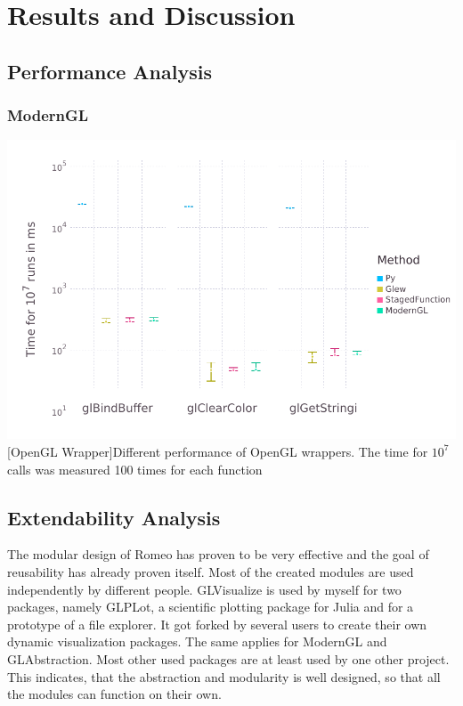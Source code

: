 \section{Results and Discussion}

\subsection{Performance Analysis}
\subsubsection{ModernGL}
\vspace{1em}
\begin{minipage}{\linewidth}
    \centering
    \includegraphics[width=0.7\linewidth]{graphics/glbench.pdf}
    [OpenGL Wrapper]{Different performance of OpenGL wrappers. The time for $10^7$ calls was measured 100 times for each function}
    \label{fig:openglwrapper}
\end{minipage}

\subsection{Extendability Analysis}

The modular design of Romeo has proven to be very effective and the goal of reusability has already proven itself.
Most of the created modules are used independently by different people.
GLVisualize is used by myself for two packages, namely GLPLot, a scientific plotting package for Julia and for a prototype of a file explorer. 
It got forked by several users to create their own dynamic visualization packages.
The same applies for ModernGL and GLAbstraction. Most other used packages are at least used by one other project.
This indicates, that the abstraction and modularity is well designed, so that all the modules can function on their own.

